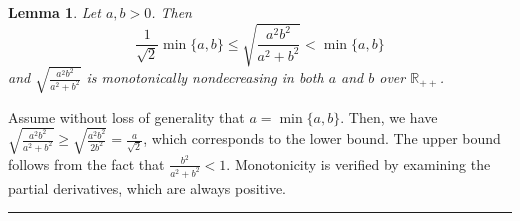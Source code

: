 \documentclass{article}
\newcommand{\R}{\mathbb{R}}
\newcommand{\jmlrBlackBox}{\rule{1.5ex}{1.5ex}}
\newcommand{\jmlrQED}{\hfill\jmlrBlackBox\par\bigskip}
\providecommand{\proofname}{Proof}
\renewenvironment{proof}%
{%
 \par\noindent{\bfseries\upshape \proofname\ }%
}%
{\jmlrQED}
\newcommand{\mP}{\mathcal{P}}
\newcommand{\mQ}{\mathcal{Q}}
\newcommand{\verts}[1]{\mathcal{V}_{#1}}
\newcommand{\defi}{\stackrel{\mathrm{\scriptscriptstyle def}}{=}}
\newtheorem{lemma}[theorem]{Lemma}
\newcommand{\gabrev}[1]{\textcolor{black}{#1}}
\begin{document}
%
\begin{lemma}\label{lemma:preparatory_bounds_pw}
Let $a, b > 0$. Then
\begin{equation}
\frac{1}{\sqrt{2}}\min\{a, b\} \le \sqrt{\frac{a^2b^2}{a^2 + b^2}} < \min\{a, b\}
\label{eq:preparatory_bounds_pw}
\end{equation}
and $\sqrt{\frac{a^2b^2}{a^2 + b^2}}$ is monotonically nondecreasing in both $a$ and $b$ over $\R_{++}$.
\end{lemma}
\begin{proof}
Assume without loss of generality that $a = \min \{a, b\}$.
Then, we have $\sqrt{\frac{a^2b^2}{a^2 + b^2}} \ge \sqrt{\frac{a^2b^2}{2b^2}} = \frac{a}{\sqrt{2}}$, which corresponds to the lower bound.
The upper bound follows from the fact that $\frac{b^2}{a^2 + b^2} < 1$.
Monotonicity is verified by examining the partial derivatives, which are always positive.
\end{proof}
\end{document}
